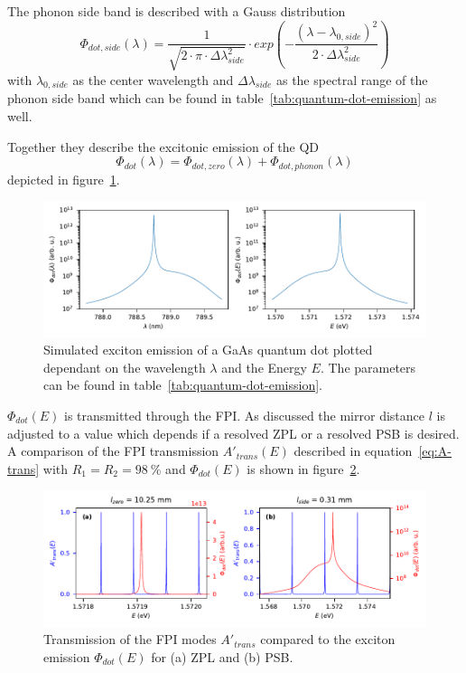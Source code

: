 The phonon side band is described with a Gauss distribution
\begin{equation}
\Phi_{dot,side}(\lambda) = \frac{1}{\sqrt{2\cdot\pi\cdot \Delta\lambda_{side}^2}}\cdot exp\left(-\frac{(\lambda - \lambda_{0, side})^2}{2\cdot \Delta\lambda_{side}^2}\right)
\end{equation}
with $\lambda_{0, side}$ as the center wavelength and $\Delta\lambda_{side}$ as the spectral range of the phonon side band which can be found in table~\ref{tab:quantum-dot-emission} as well.

Together they describe the excitonic emission of the \ac{QD}
\begin{equation}
\Phi_{dot}(\lambda) = \Phi_{dot,zero}(\lambda) + \Phi_{dot,phonon}(\lambda)
\end{equation}
depicted in figure~\ref{fig:quantumdotemissionwavelengthenergy}.

\begin{figure}[H]
	\centering
	\includegraphics{figures/fabry-perot/plots/quantum_dot_emission_wavelength_energy}
	\caption[Simulated exciton emission of a GaAs quantum dot]{Simulated exciton emission of a GaAs quantum dot plotted dependant on the wavelength $\lambda$ and the Energy $E$.
		The parameters can be found in table~\ref{tab:quantum-dot-emission}.}
	\label{fig:quantumdotemissionwavelengthenergy}
\end{figure}

$\Phi_{dot}(E)$ is transmitted through the \ac{FPI}.
As discussed the mirror distance $l$ is adjusted to a value which depends if a resolved \ac{ZPL} or a resolved \ac{PSB} is desired.
A comparison of the \ac{FPI} transmission $A'_{trans}(E)$ described in equation~\ref{eq:A-trans} with $R_1=R_2=\SI{98}{\percent}$ and $\Phi_{dot}(E)$ is shown in figure~\ref{fig:simulation-comparison-dot-fabry-perot-modes}.

\begin{figure}[H]
	\centering
	\includegraphics[width=\linewidth]{figures/fabry-perot/plots/simulation-comparison-dot-fabry-perot-modes}
	\caption{Transmission of the FPI modes $A'_{trans}$ compared to the exciton emission $\Phi_{dot}(E)$ for (a) ZPL and (b) PSB.}
	\label{fig:simulation-comparison-dot-fabry-perot-modes}
\end{figure}


